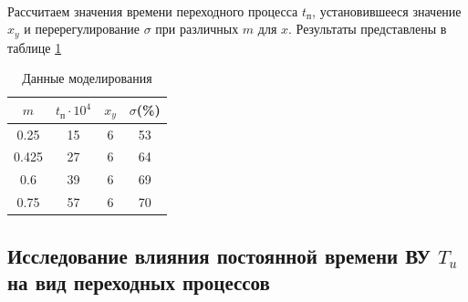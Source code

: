 \documentclass[a4paper,12pt]{article}
\renewcommand{\arraystretch}{1.5}
\begin{document}
	\paragraph{}Рассчитаем значения времени переходного процесса $t_\text{п}$, установившееся значение $x_y$ и перерегулирование $\sigma$ при различных $m$ для $x$. Результаты представлены в таблице \ref{t_2}
	\begin{table}[h]
		\centering
		\caption{Данные моделирования}
		\renewcommand{\arraystretch}{2} 
		\renewcommand{\tabcolsep}{1.75cm}
		\begin{center}
			\begin{tabular}{|c|c|c|c|}
				\hline
				$m$ & $t_\text{п} \cdot 10^4$ & $x_y$ & $\sigma$(\%)  \\ \hline
				0.25 & 15 & 6 & 53 \\ \hline
				0.425 & 27 & 6 & 64 \\ \hline
				0.6 & 39 & 6 & 69 \\ \hline
				0.75 & 57 & 6 & 70 \\ \hline
				
			\end{tabular}
		\end{center}
		\label{t_2}
	\end{table}
	\newpage
	\begin{center}
	\section{Исследование влияния постоянной времени ВУ $T_u$ на вид переходных процессов}
	\end{center}
	
\end{document}
